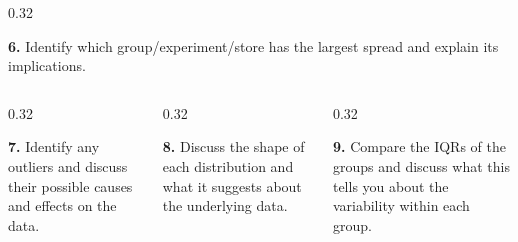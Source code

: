 \documentclass[aspectratio=169,12pt]{beamer}
\newcommand{\MMProblem}[2]{\begin{MMProblemCard}\raggedright\small\textbf{#1.} #2\par\end{MMProblemCard}}
\begin{document}
\begin{frame}[t]
\begin{columns}[T,onlytextwidth]
\begin{column}{0.32\textwidth}\MMProblem{6}{Identify which group/experiment/store has the largest spread and explain its implications.}\end{column}
\end{columns}
\vspace{0.45em}
\begin{columns}[T,onlytextwidth]
\begin{column}{0.32\textwidth}\MMProblem{7}{Identify any outliers and discuss their possible causes and effects on the data.}\end{column}
\begin{column}{0.32\textwidth}\MMProblem{8}{Discuss the shape of each distribution and what it suggests about the underlying data.}\end{column}
\begin{column}{0.32\textwidth}\MMProblem{9}{Compare the IQRs of the groups and discuss what this tells you about the variability within each group.}\end{column}
\end{columns}
\end{frame}
\end{document}
